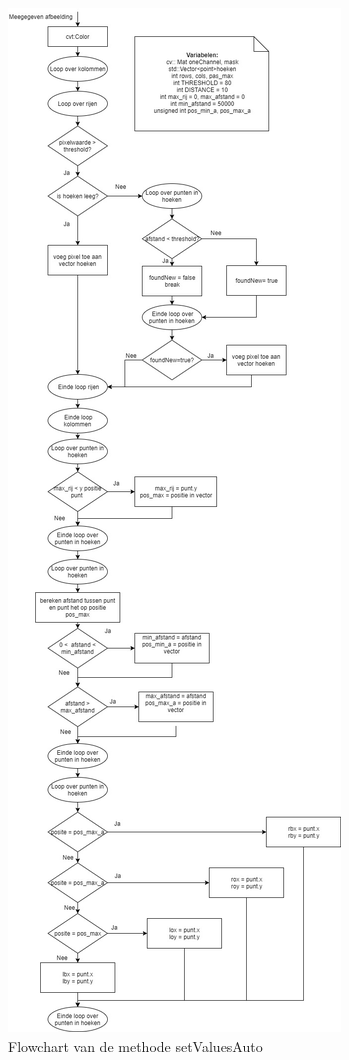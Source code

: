 \begin{figure}[hbp]
	\includegraphics[scale=0.34]{FlowChart_setValuesAuto}
	\caption{Flowchart van de methode setValuesAuto}
	\label{imgFCSVA}
\end{figure}

